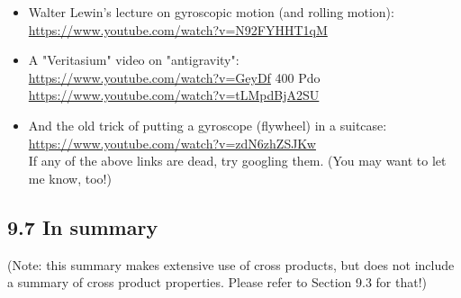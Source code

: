 \documentclass[10pt]{article}
\begin{document}
\begin{itemize}
  \item Walter Lewin's lecture on gyroscopic motion (and rolling motion):\\
\href{https://www.youtube.com/watch?v=N92FYHHT1qM}{https://www.youtube.com/watch?v=N92FYHHT1qM}
  \item A "Veritasium" video on "antigravity":\\
\href{https://www.youtube.com/watch?v=GeyDf}{https://www.youtube.com/watch?v=GeyDf} 400 Pdo\\
\href{https://www.youtube.com/watch?v=tLMpdBjA2SU}{https://www.youtube.com/watch?v=tLMpdBjA2SU}
  \item And the old trick of putting a gyroscope (flywheel) in a suitcase:\\
\href{https://www.youtube.com/watch?v=zdN6zhZSJKw}{https://www.youtube.com/watch?v=zdN6zhZSJKw}\\
If any of the above links are dead, try googling them. (You may want to let me know, too!)
\end{itemize}

\subsection*{9.7 In summary}
(Note: this summary makes extensive use of cross products, but does not include a summary of cross product properties. Please refer to Section 9.3 for that!)
\end{document}
